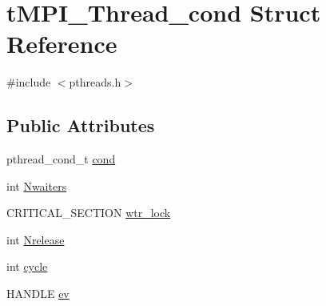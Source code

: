 \hypertarget{structtMPI__Thread__cond}{\section{t\-M\-P\-I\-\_\-\-Thread\-\_\-cond \-Struct \-Reference}
\label{structtMPI__Thread__cond}
}


{\ttfamily \#include $<$pthreads.\-h$>$}

\subsection*{\-Public \-Attributes}
\begin{DoxyCompactItemize}
\item 
pthread\-\_\-cond\-\_\-t \hyperlink{structtMPI__Thread__cond_ae2eb826f6e4bbced7a3208e7836487be}{cond}
\item 
int \hyperlink{structtMPI__Thread__cond_ad988b9ceb97398fbd7cacf9719ec4922}{\-Nwaiters}
\item 
\-C\-R\-I\-T\-I\-C\-A\-L\-\_\-\-S\-E\-C\-T\-I\-O\-N \hyperlink{structtMPI__Thread__cond_a333811c3a5bcca48b981931fa357b590}{wtr\-\_\-lock}
\item 
int \hyperlink{structtMPI__Thread__cond_a396ae8e64192f9a362f6c9b9ab1a2a88}{\-Nrelease}
\item 
int \hyperlink{structtMPI__Thread__cond_a21ace41886012d710ef7accc0580e075}{cycle}
\item 
\-H\-A\-N\-D\-L\-E \hyperlink{structtMPI__Thread__cond_a7dd54aee653465790ff96978b83f3887}{ev}
\end{DoxyCompactItemize}


